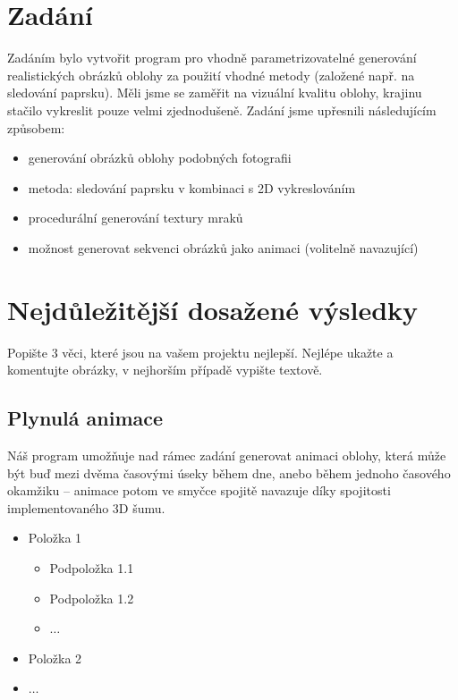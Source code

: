 \documentclass[12pt,a4paper,titlepage,final]{report}
\begin{document}
\chapter{Zadání}

Zadáním bylo vytvořit program pro vhodně parametrizovatelné generování realistických obrázků oblohy za použití vhodné metody (založené např. na sledování paprsku). Měli jsme se zaměřit na vizuální kvalitu oblohy, krajinu stačilo vykreslit pouze velmi zjednodušeně. Zadání jsme upřesnili následujícím způsobem:

\begin{itemize}
    \item generování obrázků oblohy podobných fotografii
    \item metoda: sledování paprsku v kombinaci s 2D vykreslováním
    \item procedurální generování textury mraků
    \item možnost generovat sekvenci obrázků jako animaci (volitelně navazující)
\end{itemize}

\chapter{Nejdůležitější dosažené výsledky}

Popište 3 věci, které jsou na vašem projektu nejlepší. Nejlépe ukažte a
komentujte obrázky, v nejhorším případě vypište textově.

\section{Plynulá animace}

Náš program umožňuje nad rámec zadání generovat animaci oblohy, která
může být buď mezi dvěma časovými úseky během dne, anebo během jednoho
časového okamžiku -- animace potom ve smyčce spojitě navazuje díky
spojitosti implementovaného 3D šumu.

\begin{itemize}
    \item Položka 1
    \begin{itemize}
        \item Podpoložka 1.1
        \item Podpoložka 1.2
        \item $\ldots$
    \end{itemize}
    \item Položka 2
    \item $\ldots$
\end{itemize}
\end{document}
